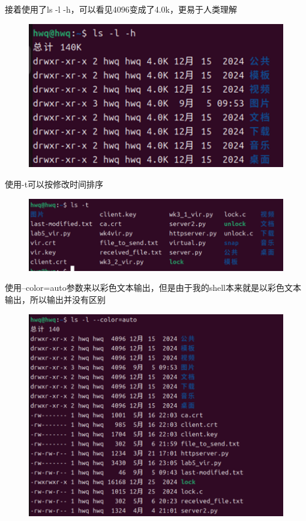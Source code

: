 \documentclass[a4paper, 12pt]{article}
\begin{document}
接着使用了ls -l -h，可以看见4096变成了4.0k，更易于人类理解
\begin{figure}[H]
    \centering
    \includegraphics[width=1\linewidth]{shell13.png}
\end{figure}
使用-t可以按修改时间排序
\begin{figure}[H]
    \centering
    \includegraphics[width=1\linewidth]{shell14.png}
\end{figure}
使用--color=auto参数来以彩色文本输出，但是由于我的shell本来就是以彩色文本输出，所以输出并没有区别
\begin{figure}[H]
    \centering
    \includegraphics[width=1\linewidth]{shell15.png}
\end{figure}
\end{document}
